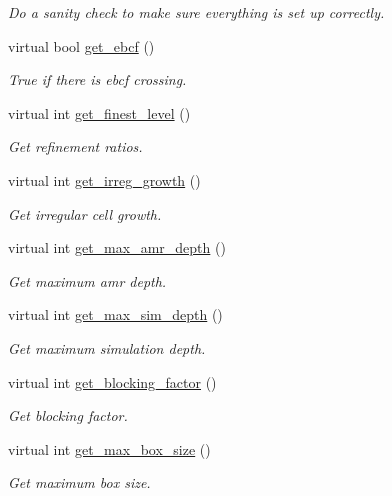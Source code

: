 \begin{DoxyCompactItemize}
\begin{DoxyCompactList}\small\item\em Do a sanity check to make sure everything is set up correctly. \end{DoxyCompactList}\item 
virtual bool \hyperlink{classamr__mesh_aa1ac5530867868dea66424bcc0965397}{get\+\_\+ebcf} ()
\begin{DoxyCompactList}\small\item\em True if there is ebcf crossing. \end{DoxyCompactList}\item 
virtual int \hyperlink{classamr__mesh_a8d6f396aa7d2263325d68cba633ccae6}{get\+\_\+finest\+\_\+level} ()
\begin{DoxyCompactList}\small\item\em Get refinement ratios. \end{DoxyCompactList}\item 
virtual int \hyperlink{classamr__mesh_a09f4583d18581300c2fe20ff83af74fb}{get\+\_\+irreg\+\_\+growth} ()
\begin{DoxyCompactList}\small\item\em Get irregular cell growth. \end{DoxyCompactList}\item 
virtual int \hyperlink{classamr__mesh_ab3bf87ba502b505df32d84fafe55dadb}{get\+\_\+max\+\_\+amr\+\_\+depth} ()
\begin{DoxyCompactList}\small\item\em Get maximum amr depth. \end{DoxyCompactList}\item 
virtual int \hyperlink{classamr__mesh_af69a654c8bdbd4e60c5c5a03c1da3738}{get\+\_\+max\+\_\+sim\+\_\+depth} ()
\begin{DoxyCompactList}\small\item\em Get maximum simulation depth. \end{DoxyCompactList}\item 
virtual int \hyperlink{classamr__mesh_a56648b1ece6037034a4c9c74d8826548}{get\+\_\+blocking\+\_\+factor} ()
\begin{DoxyCompactList}\small\item\em Get blocking factor. \end{DoxyCompactList}\item 
virtual int \hyperlink{classamr__mesh_a51116d32258ee320b6cfcd4addf7ccc3}{get\+\_\+max\+\_\+box\+\_\+size} ()
\begin{DoxyCompactList}\small\item\em Get maximum box size. \end{DoxyCompactList}\item 

\end{DoxyCompactItemize}

